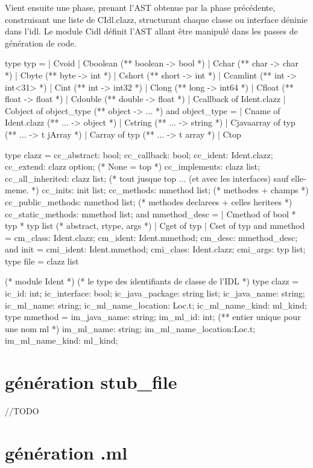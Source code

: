 \documentclass[a4paper, 11pt]{report}
\begin{document}
Vient ensuite une phase, prenant l'AST obtenue par la
phase précédente, construisant une liste de CIdl.clazz, structurant
chaque classe ou interface déninie dans l'idl. 
Le module Cidl définit l'AST allant être manipulé dans les passes de
génération de code.
\begin{OCaml}
type typ =
  | Cvoid
  | Cboolean (** boolean -> bool *)
  | Cchar (** char -> char *)
  | Cbyte (** byte -> int *)
  | Cshort (** short -> int *)
  | Ccamlint (** int -> int<31> *)
  | Cint (** int -> int32 *)
  | Clong (** long -> int64 *)
  | Cfloat (** float -> float *)
  | Cdouble (** double -> float *)
  | Ccallback of Ident.clazz
  | Cobject of object_type (** object -> ... *)
and object_type = 
  | Cname of Ident.clazz (** ... -> object *)
  | Cstring (** ... -> string *)
  | Cjavaarray of typ (** ... -> t jArray *) 
  | Carray of typ (** ... -> t array *) 
  | Ctop

type clazz = {
    cc_abstract: bool;
    cc_callback: bool;
    cc_ident: Ident.clazz;
    cc_extend: clazz option; (* None = top *)
    cc_implements: clazz list;
    cc_all_inherited: clazz list; (* tout jusque top ... (et avec les interfaces) sauf elle-meme. *)
    cc_inits: init list;
    cc_methods: mmethod list; (* methodes + champs *)
    cc_public_methods: mmethod list; (* methodes declarees + celles heritees *)
    cc_static_methods: mmethod list; 
  }
and mmethod_desc = 
  | Cmethod of bool * typ * typ list (* abstract, rtype, args *)
  | Cget of typ
  | Cset of typ
and mmethod = {
    cm_class: Ident.clazz;
    cm_ident: Ident.mmethod; 
    cm_desc: mmethod_desc;
  }         
and init = {
    cmi_ident: Ident.mmethod;
    cmi_class: Ident.clazz;
    cmi_args: typ list;
  }
type file = clazz list
\end{OCaml}
\begin{OCaml}
(* module Ident  *)
(* le type des identifiants de classe de l'IDL *)
type clazz = {
    ic_id: int;
    ic_interface: bool;
    ic_java_package: string list;
    ic_java_name: string;
    ic_ml_name: string;
    ic_ml_name_location: Loc.t;
    ic_ml_name_kind: ml_kind;
  }
type mmethod = {
    im_java_name: string;
    im_ml_id: int; (** entier unique pour une nom ml *)
    im_ml_name: string;
    im_ml_name_location:Loc.t;
    im_ml_name_kind: ml_kind;
  }
\end{OCaml}
\section{génération stub\_file}
//TODO
\section{génération .ml}
\end{document}

